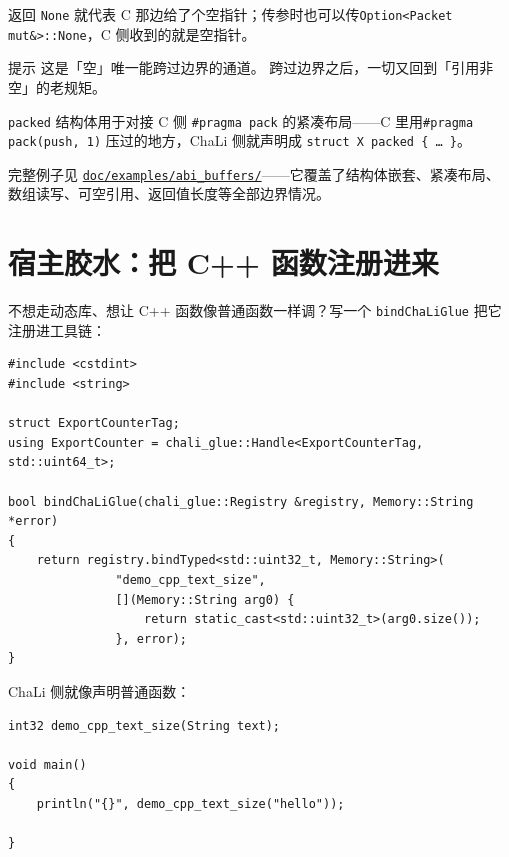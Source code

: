 返回 \texttt{None} 就代表 C 那边给了个空指针；传参时也可以传\texttt{Option<\allowbreak{}Packet mut\&>\allowbreak{}:\allowbreak{}:\allowbreak{}None}，C 侧收到的就是空指针。

\begin{tip}{提示}
这是「空」唯一能跨过边界的通道。 跨过边界之后，一切又回到「引用非空」的老规矩。
\end{tip}

\texttt{packed} 结构体用于对接 C 侧 \texttt{\#pragma pack} 的紧凑布局——C 里用\texttt{\#pragma pack(\allowbreak{}push,\allowbreak{} 1)\allowbreak{}} 压过的地方，ChaLi 侧就声明成 \texttt{struct X packed \{ … \}}。

完整例子见 \href{https://gitee.com/rabbitc999/chali/tree/master/doc/examples/abi_buffers}{\texttt{doc/\allowbreak{}examples/\allowbreak{}abi\_buffers/\allowbreak{}}}——它覆盖了结构体嵌套、紧凑布局、数组读写、可空引用、返回值长度等全部边界情况。

\section{宿主胶水：把 C++ 函数注册进来}

不想走动态库、想让 C++ 函数像普通函数一样调？写一个 \texttt{bind\allowbreak{}Cha\allowbreak{}Li\allowbreak{}Glue} 把它注册进工具链：

\par
\medskip
\begin{lstlisting}[style=cpp]
#include <cstdint>
#include <string>

struct ExportCounterTag;
using ExportCounter = chali_glue::Handle<ExportCounterTag, std::uint64_t>;

bool bindChaLiGlue(chali_glue::Registry &registry, Memory::String *error)
{
    return registry.bindTyped<std::uint32_t, Memory::String>(
               "demo_cpp_text_size",
               [](Memory::String arg0) {
                   return static_cast<std::uint32_t>(arg0.size());
               }, error);
}
\end{lstlisting}
\par
\medskip

ChaLi 侧就像声明普通函数：

\par
\medskip
\begin{lstlisting}[style=chali]
int32 demo_cpp_text_size(String text);

void main()
{
    println("{}", demo_cpp_text_size("hello"));

}
\end{lstlisting}
\par
\medskip

